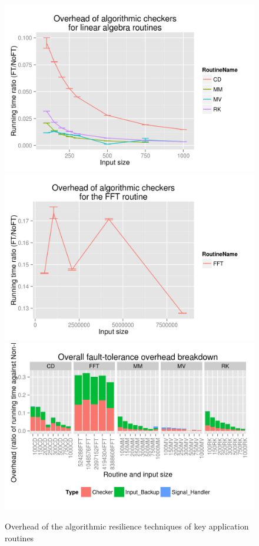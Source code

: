 \documentclass{sig-alternate}
\begin{document}
\begin{figure}[ht!]
\centering
\includegraphics[width=1.00\columnwidth]{figs/4_1_1_Exp1_linalg}
\includegraphics[width=1.00\columnwidth]{figs/4_1_1_Exp1_fft}
\includegraphics[width=1.00\columnwidth]{figs/4_1_1_Overall_Breakdown.png}
\caption{Overhead of the algorithmic resilience techniques of key application routines}
\label{fig:algo_ovhd}
\end{figure}
\end{document}
